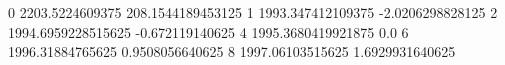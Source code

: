 0 2203.5224609375 208.1544189453125
1 1993.347412109375 -2.0206298828125
2 1994.6959228515625 -0.672119140625
4 1995.3680419921875 0.0
6 1996.31884765625 0.9508056640625
8 1997.06103515625 1.6929931640625
